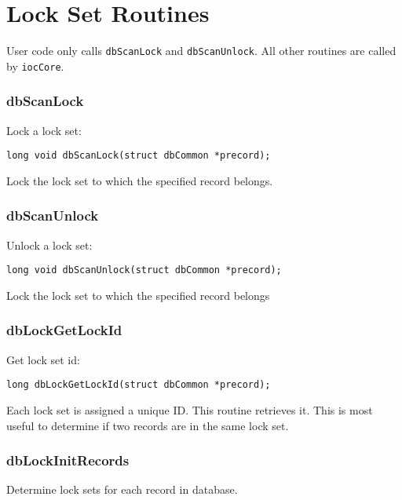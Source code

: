 \section{Lock Set Routines}

User code only calls \verb|dbScanLock| and \verb|dbScanUnlock|.
All other routines are called by \verb|iocCore|.

\subsubsection{dbScanLock}

Lock a lock set:

\begin{verbatim}
long void dbScanLock(struct dbCommon *precord);
\end{verbatim}

Lock the lock set to which the specified record belongs.

\subsubsection{dbScanUnlock}

Unlock a lock set:

\begin{verbatim}
long void dbScanUnlock(struct dbCommon *precord);
\end{verbatim}

Lock the lock set to which the specified record belongs

\subsubsection{dbLockGetLockId}

Get lock set id:

\begin{verbatim}
long dbLockGetLockId(struct dbCommon *precord);
\end{verbatim}

Each lock set is assigned a unique ID.
This routine retrieves it.
This is most useful to determine if two records are in the same lock set.

\subsubsection{dbLockInitRecords}

Determine lock sets for each record in database.

